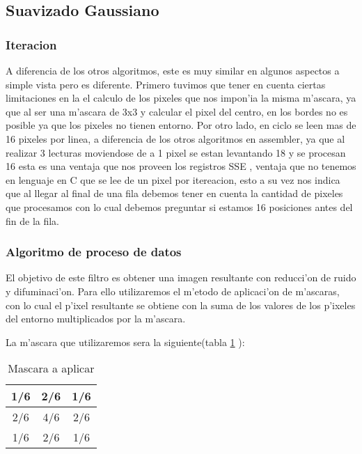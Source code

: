 \subsection{Suavizado Gaussiano}

\subsubsection{Iteracion}
A diferencia de los otros algoritmos, este es muy similar en algunos aspectos a simple vista pero es diferente.
Primero tuvimos que tener en cuenta ciertas limitaciones en la el calculo de los pixeles que nos impon'ia la misma m'ascara, ya que al ser una m'ascara de 3x3 y calcular el pixel del centro, en los bordes no es posible ya que los pixeles no tienen entorno.
Por otro lado, en ciclo se leen mas de 16 pixeles por linea, a diferencia de los otros algoritmos en assembler, ya que al realizar 3 lecturas moviendose de a 1 pixel se estan levantando 18 y se procesan 16 esta es una ventaja que nos proveen los registros SSE , ventaja que no tenemos en lenguaje en C que se lee de un pixel por itereacion, esto a su vez nos indica que al llegar al final de una fila debemos tener en cuenta la cantidad de pixeles que procesamos con lo cual debemos preguntar si estamos 16 posiciones antes del fin de la fila.

\subsubsection{Algoritmo de proceso de datos}
El objetivo de este filtro es obtener una imagen resultante con reducci'on de ruido y difuminaci'on. 
Para ello utilizaremos el m'etodo de aplicaci'on de m'ascaras, con lo cual el p'ixel resultante se obtiene con la suma
de los valores de los p'ixeles del entorno multiplicados por la m'ascara.

La m'ascara que utilizaremos sera la siguiente(tabla \ref{tab:s-uno} ):

\begin{table}[h!]
\begin{center}
\begin{tabular}{| c | c | c |}
\hline
1/6 & 2/6 & 1/6 \\ \hline
2/6 & 4/6 & 2/6 \\ \hline
1/6 & 2/6 & 1/6 \\ \hline
\end{tabular}
\end{center}
\caption{Mascara a aplicar}
\label{tab:s-uno}
\end{table}

